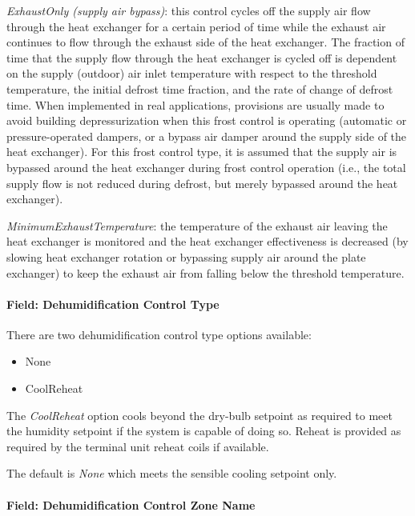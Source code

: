 \emph{ExhaustOnly (supply air bypass)}: this control cycles off the supply air flow through the heat exchanger for a certain period of time while the exhaust air continues to flow through the exhaust side of the heat exchanger. The fraction of time that the supply flow through the heat exchanger is cycled off is dependent on the supply (outdoor) air inlet temperature with respect to the threshold temperature, the initial defrost time fraction, and the rate of change of defrost time. When implemented in real applications, provisions are usually made to avoid building depressurization when this frost control is operating (automatic or pressure-operated dampers, or a bypass air damper around the supply side of the heat exchanger). For this frost control type, it is assumed that the supply air is bypassed around the heat exchanger during frost control operation (i.e., the total supply flow is not reduced during defrost, but merely bypassed around the heat exchanger).

\emph{MinimumExhaustTemperature}: the temperature of the exhaust air leaving the heat exchanger is monitored and the heat exchanger effectiveness is decreased (by slowing heat exchanger rotation or bypassing supply air around the plate exchanger) to keep the exhaust air from falling below the threshold temperature.

\paragraph{Field: Dehumidification Control Type}\label{field-dehumidification-control-type-6}

There are two dehumidification control type options available:

\begin{itemize}
\item
  None
\item
  CoolReheat
\end{itemize}

The \emph{CoolReheat} option cools beyond the dry-bulb setpoint as required to meet the humidity setpoint if the system is capable of doing so. Reheat is provided as required by the terminal unit reheat coils if available.

The default is \emph{None} which meets the sensible cooling setpoint only.

\paragraph{Field: Dehumidification Control Zone Name}\label{field-dehumidification-control-zone-name-5}


